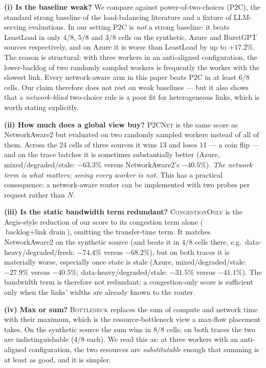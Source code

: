 \textbf{(i) Is the baseline weak?} We compare against power-of-two-choices (P2C), the standard
strong baseline of the load-balancing literature and a fixture of LLM-serving evaluations. In our
setting P2C is \emph{not} a strong baseline: it beats LeastLoad in only $4/8$, $5/8$ and $3/8$
cells on the synthetic, Azure and BurstGPT sources respectively, and on Azure it is worse than
LeastLoad by up to $+17.2\%$. The reason is structural: with three workers in an anti-aligned
configuration, the lower-backlog of two randomly sampled workers is frequently the worker with
the slowest link. Every network-aware arm in this paper beats P2C in at least $6/8$ cells.
Our claim therefore does not rest on weak baselines --- but it also shows that a
\emph{network-blind} two-choice rule is a poor fit for heterogeneous links, which is worth stating
explicitly.

\textbf{(ii) How much does a global view buy?} \textsc{P2CNet} is the same score as
NetworkAware2 but evaluated on two randomly sampled workers instead of all of them. Across the 24
cells of three sources it wins 13 and loses 11 --- a coin flip --- and on the trace batches it is
sometimes substantially better (Azure, mixed/degraded/stale: $-63.3\%$ versus NetworkAware2's
$-40.5\%$). \emph{The network term is what matters; seeing every worker is not.} This has a
practical consequence: a network-aware router can be implemented with two probes per request
rather than $N$.

\textbf{(iii) Is the static bandwidth term redundant?} \textsc{CongestionOnly} is the
Aegis-style reduction of our score to its congestion term alone ($\text{backlog} +
\text{link drain}$), omitting the transfer-time term. It matches NetworkAware2 on the synthetic
source (and beats it in $4/8$ cells there, e.g.\ data-heavy/degraded/fresh: $-74.4\%$ versus
$-68.2\%$), but on both traces it is materially worse, especially once state is stale (Azure,
mixed/degraded/stale: $-27.9\%$ versus $-40.5\%$; data-heavy/degraded/stale: $-31.5\%$ versus
$-41.1\%$). The bandwidth term is therefore not redundant; a congestion-only score is sufficient
only when the links' widths are already known to the router.

\textbf{(iv) Max or sum?} \textsc{Bottleneck} replaces the sum of compute and network time with
their maximum, which is the resource-bottleneck view a max-flow placement takes. On the synthetic
source the sum wins in $8/8$ cells; on both traces the two are indistinguishable ($4/8$ each).
We read this as: at three workers with an anti-aligned configuration, the two resources are
\emph{substitutable} enough that summing is at least as good, and it is simpler.

